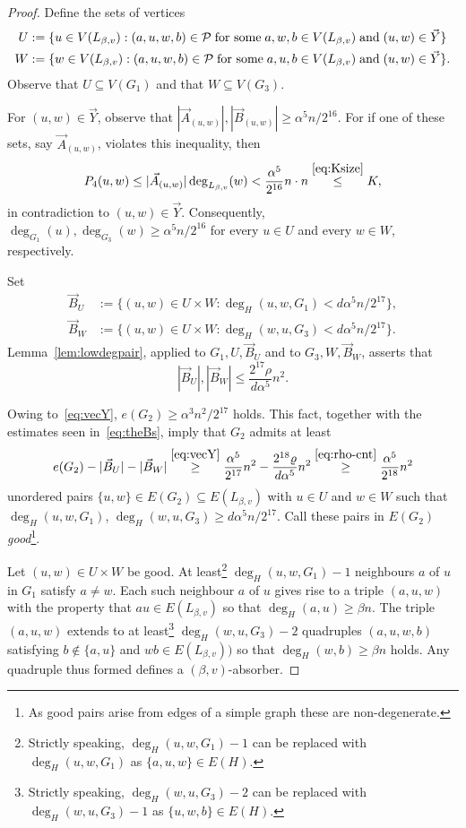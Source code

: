 \documentclass[11pt,reqno]{amsart}
\begin{document}
\begin{proof}
Define the sets of vertices 
\begin{align*}
U & := \{u \in V(L_{\beta,v}): (a,u,w,b) \in \P\; \text{for some}\; a,w,b \in V(L_{\beta,v}) \mand (u,w) \in \vec Y\}\\ 
W & := \{w \in V(L_{\beta,v}): (a,u,w,b) \in \P\; \text{for some}\; a,u,b \in V(L_{\beta,v})\mand (u,w) \in \vec Y\}.
\end{align*}
Observe that $U \subseteq V(G_1)$ and that $W \subseteq V(G_3)$.



For $(u,w) \in \vec Y$, observe that $|\vec A_{(u,w)}|, |\vec B_{(u,w)}| \geq \alpha^5 n /2^{16}$. For if one of these sets, say $\vec A_{(u,w)}$, violates this inequality, then 
$$
P_4(u,w) \leq |\vec A_{(u,w)}| \deg_{L_{\beta,v}}(w) < \frac{\alpha^5}{2^{16}} n \cdot  n \overset{\eqref{eq:Ksize}}{\leq} K,
$$ 
in contradiction to $(u,w) \in \vec Y$. 
Consequently, $\deg_{G_1}(u), \deg_{G_3}(w) \geq \alpha^5 n /2^{16}$ for every $u \in U$ and every $w \in W$, respectively. 

Set 
\begin{align*}
\vec B_U &:= \{(u,w) \in U \times W: \deg_H(u,w,G_1) < d\alpha^5 n /2^{17}\},\\
\vec B_W &:= \{(u,w) \in U \times W: \deg_H(w,u,G_3) < d\alpha^5 n /2^{17}\}.
\end{align*}
Lemma~\ref{lem:lowdegpair}, applied to $G_1, U,\vec B_U$ and to $G_3, W, \vec B_W$, asserts that
\begin{equation}\label{eq:theBs}
|\vec B_U|,|\vec B_W| \leq \frac{2^{17} \rho}{d \alpha^5} n^2.
\end{equation}


Owing to~\eqref{eq:vecY}, $e(G_2) \geq \alpha^3n^2/2^{17}$ holds. This fact, together with the estimates seen in~\eqref{eq:theBs}, imply that $G_2$ admits at least 
$$
e(G_2) - |\vec B_U|-|\vec B_W| \overset{\eqref{eq:vecY}}{\geq} \frac{\alpha^5}{2^{17}} n^2 - \frac{2^{18} \rho}{d \alpha^5}  n^2 \overset{\eqref{eq:rho-cnt}}{\geq} \frac{\alpha^5}{2^{18}} n^2 
$$ 
unordered pairs $\{u,w\} \in E(G_2) \subseteq E(L_{\beta,v})$ with $u \in U$ and $w \in W$ such that $\deg_H(u,w,G_1)$, $\deg_H(w,u,G_3) \geq d\alpha^5 n/ 2^{17}$. Call these pairs in $E(G_2)$ {\em good}\footnote{As good pairs arise from edges of a simple graph these are non-degenerate.}. 

Let $(u,w) \in U \times W$ be good. At least\footnote{Strictly speaking, $\deg_H(u,w,G_1)-1$ can be replaced with $\deg_H(u,w,G_1)$ as $\{a,u,w\} \in E(H)$.} $\deg_H(u,w,G_1)-1$ neighbours $a$ of  $u$ in $G_1$ satisfy $a \not= w$. Each such neighbour $a$ of $u$ gives rise to a triple $(a,u,w)$ with the property that $au \in E(L_{\beta,v})$ so that $\deg_H(a,u) \geq \beta n$. The triple $(a,u,w)$ extends to at least\footnote{Strictly speaking, $\deg_H(w,u,G_3)-2$ can be replaced with $\deg_H(w,u,G_3)-1$ as $\{u,w,b\} \in E(H)$.} $\deg_H(w,u,G_3) - 2$ quadruples $(a,u,w,b)$ satisfying $b \notin \{a,u\}$ and $wb \in E(L_{\beta,v}))$ so that $\deg_H(w,b) \geq \beta n$ holds. Any quadruple thus formed defines a $(\beta,v)$-absorber.


\end{proof}
\end{document}
